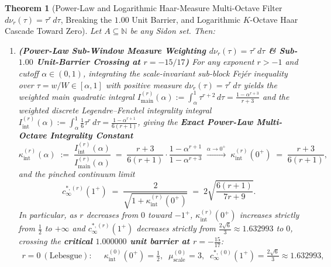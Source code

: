 \documentclass[11pt,reqno]{amsart}
\newtheorem{theorem}{Theorem}[section]
\theoremstyle{definition}
\theoremstyle{remark}
\begin{document}
\begin{theorem}[Power-Law and Logarithmic Haar-Measure Multi-Octave Filter $d\nu_r(\tau) = \tau^r\,d\tau$, Breaking the $1.00$ Unit Barrier, and Logarithmic $K$-Octave Haar Cascade Toward Zero]\label{thm:haar_multioctave}
Let $A \subseteq \mathbb{N}$ be any Sidon set. Then:
\begin{enumerate}
  \item[\textup{(a)}] \textbf{(Power-Law Sub-Window Measure Weighting $d\nu_r(\tau) = \tau^r\,d\tau$ \& Sub-$1.00$ Unit-Barrier Crossing at $r = -15/17$)} For any exponent $r > -1$ and cutoff $\alpha \in (0, 1)$, integrating the scale-invariant sub-block Fej\'er inequality over $\tau = w/W \in [\alpha, 1]$ with positive measure $d\nu_r(\tau) = \tau^r\,d\tau$ yields the weighted main quadratic integral $I_{\mathrm{main}}^{(r)}(\alpha) := \int_\alpha^1 \tau^{r+2}\,d\tau = \frac{1 - \alpha^{r+3}}{r + 3}$ and the weighted discrete Legendre--Fenchel integrality integral $I_{\mathrm{int}}^{(r)}(\alpha) := \int_\alpha^1 \frac{1}{6}\tau^r\,d\tau = \frac{1 - \alpha^{r+1}}{6(r + 1)}$, giving the \textbf{Exact Power-Law Multi-Octave Integrality Constant}
  \begin{equation}\label{eq:kappa_int_power_law}
    \kappa_{\mathrm{int}}^{(r)}(\alpha) \;:=\; \frac{I_{\mathrm{int}}^{(r)}(\alpha)}{I_{\mathrm{main}}^{(r)}(\alpha)} \;=\; \frac{r + 3}{6(r + 1)} \cdot \frac{1 - \alpha^{r+1}}{1 - \alpha^{r+3}} \;\xrightarrow{\alpha \to 0^+}\; \kappa_{\mathrm{int}}^{(r)}(0^+) \;=\; \frac{r + 3}{6(r + 1)},
  \end{equation}
  and the pinched continuum limit
  \begin{equation}\label{eq:c_infty_power_law}
    c_\infty^{*,(r)}(1^+) \;=\; \frac{2}{\sqrt{1 + \kappa_{\mathrm{int}}^{(r)}(0^+)}} \;=\; 2\sqrt{\frac{6(r + 1)}{7r + 9}}.
  \end{equation}
  In particular, as $r$ decreases from $0$ toward $-1^+$, $\kappa_{\mathrm{int}}^{(r)}(0^+)$ increases strictly from $\frac{1}{2}$ to $+\infty$ and $c_\infty^{*,(r)}(1^+)$ decreases strictly from $\frac{2\sqrt{6}}{3} \approx 1.632993$ to $0$, crossing the \textbf{critical $1.000000$ unit barrier at $r = -\frac{15}{17}$}:
  \begin{equation}\label{eq:power_law_milestones}
    \begin{aligned}
      r = 0\ (\text{Lebesgue}): &\;\; \kappa_{\mathrm{int}}^{(0)}(0^+) = \frac{1}{2},\;\; \mu_{\mathrm{scale}}^{(0)} = 3,\;\; c_\infty^{*,(0)}(1^+) = \frac{2\sqrt{6}}{3} \approx 1.632993, \\

\end{aligned}
\end{equation}
\end{enumerate}
\end{theorem}
\end{document}
